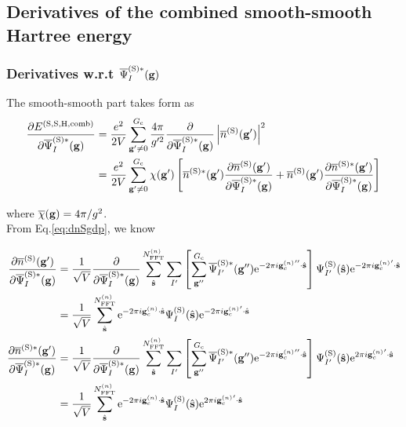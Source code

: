 \documentclass[paper=a4, fontsize=11pt]{article} %
\numberwithin{equation}{section} %
\numberwithin{figure}{section} %
\numberwithin{table}{section} %
\newcommand{\p}{\partial}
\newcommand{\ol}{\overline}
\newcommand{\bs}{{\bf{s}}}
\newcommand{\bg}{{\bf{g}}}
\newcommand{\rS}{{\mathrm{S}}}
\newcommand{\re}{{\mathrm{e}}}
\newcommand{\rH}{{\mathrm{H}}}
\newcommand{\rcomb}{{\mathrm{comb}}}
\newcommand{\gcn}{{\bg_c^{(n)}}}
\newcommand{\igcns}{2\pi i\gcn\cdot\hat \bs}
\newcommand{\igpcns}{2\pi i\gcn'\cdot\hat \bs}
\newcommand{\psigsc}{{\overline \Psi_I^{(\rS)*}(\bg)}}
\newcommand{\NFFTn}{{N^{(n)}_{\mathrm{FFT}}}}
\newcommand{\Gc}{{G_{\mathrm{c}}}}
\begin{document}
\subsection{Derivatives of the combined smooth-smooth Hartree energy}
\subsubsection{Derivatives w.r.t $\psigsc$}
The smooth-smooth part takes form as
\begin{equation}
\begin{split}
\frac{\p E^{(\rS,\rS,\rH,\rcomb)}}{\p \psigsc}
&= \frac{e^2}{2V} \sum_{\bg' \neq 0}^\Gc \frac{4\pi}{g'^2} \frac{\p}{\p \psigsc} \left|\overline{n}^{(\rS)}(\bg')\right|^2 \\
&= \frac{e^2}{2V} \sum_{\bg' \neq 0}^\Gc \chi(\bg') \left[\overline{n}^{(\rS)*}(\bg') \frac{\p  \overline{n}^{(\rS)}(\bg')}{\p \psigsc} + \overline{n}^{(\rS)}(\bg') \frac{\p \overline{n}^{(\rS)*}(\bg')}{\p \psigsc}  \right]\\
\end{split}
\end{equation}

where $\ol \chi(\bg) = 4 \pi /g^2$.\\


From Eq.\eqref{eq:dnSgdp}, we know

\begin{equation}
\begin{split}
\frac{\p \ol {n}^{(\rS)}(\bg')}{ \p \psigsc}
&= \frac{1}{\sqrt V} \frac{\p }{ \p \psigsc} \sum_{\hat \bs}^\NFFTn  \sum_{I'}  \left[\sum_{\bg''}^\Gc \overline{\Psi}_{I'}^{(\rS)*}(\bg'')  \re^{-2\pi i \gcn'' \cdot \hat \bs}\right] \Psi_{I'}^{(\rS)}(\hat \bs) \re^{-\igpcns} \\
&= \frac{1}{\sqrt V} \sum_{\hat \bs}^\NFFTn   \re^{-\igcns}\Psi_{I}^{(\rS)}(\hat \bs) \re^{-\igpcns} \\
\frac{\p \ol {n}^{(\rS)*}(\bg')}{ \p \psigsc}
&= \frac{1}{\sqrt V} \frac{\p }{ \p \psigsc} \sum_{\hat \bs}^\NFFTn  \sum_{I'}  \left[\sum_{\bg''}^\Gc \overline{\Psi}_{I'}^{(\rS)*}(\bg'')  \re^{-2\pi i \gcn'' \cdot \hat \bs}\right] \Psi_{I'}^{(\rS)}(\hat \bs) \re^{\igpcns} \\
&= \frac{1}{\sqrt V} \sum_{\hat \bs}^\NFFTn   \re^{-\igcns}\Psi_{I}^{(\rS)}(\hat \bs) \re^{\igpcns} \\
\end{split}
\end{equation}
\end{document}
